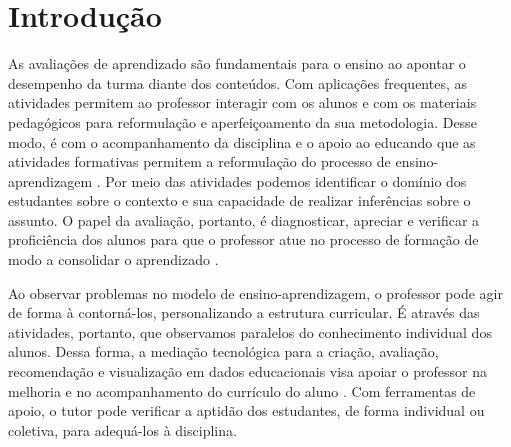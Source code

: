 
\chapter{Introdução}\label{intro}

As avaliações de aprendizado são fundamentais para o ensino ao apontar o desempenho da turma diante dos conteúdos. Com aplicações frequentes, as atividades permitem ao professor interagir com os alunos e com os materiais pedagógicos para reformulação e aperfeiçoamento da sua metodologia. Desse modo, é com o acompanhamento da disciplina e o apoio ao educando que as atividades formativas permitem a reformulação do processo de ensino-aprendizagem \cite{barreira2006}. Por meio das atividades podemos identificar o domínio dos estudantes sobre o contexto e sua capacidade de realizar inferências sobre o assunto. O papel da avaliação, portanto, é diagnosticar, apreciar e verificar a proficiência dos alunos para que o professor atue no processo de formação de modo a consolidar o aprendizado \cite{oliveira2005}.

Ao observar problemas no modelo de ensino-aprendizagem, o professor pode agir de forma à contorná-los, personalizando a estrutura curricular. É através das atividades, portanto, que  observamos paralelos do conhecimento individual dos alunos. Dessa forma, a mediação tecnológica para a criação, avaliação, recomendação e visualização em dados educacionais visa apoiar o professor na melhoria e no acompanhamento do currículo do aluno \cite{paiva2012}. Com ferramentas de apoio, o tutor pode verificar a aptidão dos estudantes, de forma individual ou coletiva, para adequá-los à disciplina.

\begin{comment}
Nesses casos é essencial que ocorram ajustes na formação dos alunos e nas práticas docentes.

, há o risco de afetar a produtividade discente na disciplina atual e posteriores afetando características essenciais para  senso crítico


O aprendizado observado por cada atividade pode estimular diferentes atos dos alunos dando ênfaze em determinados pontos do conteúdo e sua prática

Observamos com frequência o desenvolvimento da escrita, criatividade, comunicação e trabalho em equipe dos alunos com divisão em equipes, exercício da escrita, a busca textual, os grupos de discussão, dentre outros.

Enquanto o foco de todas as contribuições para organização em sala de aula são centralizados no professor e este lida com várias salas há sobrecarga deste profissional. 
\end{comment}

